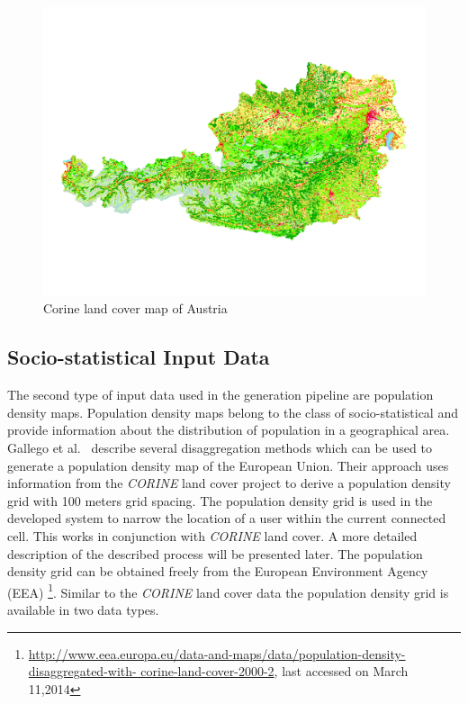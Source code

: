 \begin{figure}
	\centering
	\includegraphics[width=\linewidth]{./images/clc_austria.png}
	\caption{Corine land cover map of Austria}
	\label{fig:clc_austria}
\end{figure}

\subsection{Socio-statistical Input Data}
The second type of input data used in the generation pipeline are population density maps. Population density maps belong to the class of socio-statistical and provide information about the distribution of population in a geographical area. Gallego et al.\ \cite{Gallego2010,Gallego2011} describe several disaggregation methods which can be used to generate a population density map of the European Union.
Their approach uses information from the \emph{CORINE} land cover project to derive a population density grid with 100 meters grid spacing. The population density grid is used in the developed system to narrow the location of a user within the current connected cell. This works in conjunction with \emph{CORINE} land cover. A more detailed description of the described process will be presented later.
The population density grid can be obtained freely from the European Environment Agency (EEA) \footnote{\url{http://www.eea.europa.eu/data-and-maps/data/population-density-disaggregated-with-
	corine-land-cover-2000-2}, last accessed on March 11,2014}. Similar to the \emph{CORINE} land cover data the population density grid is available in two data types.
